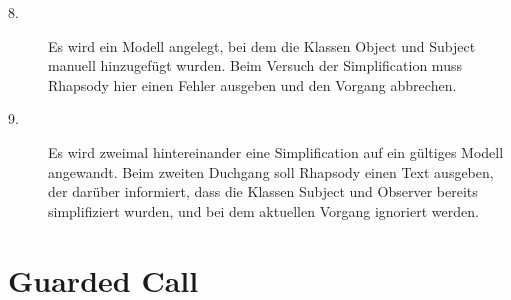 \begin{description}
	\item[8.]
	Es wird ein Modell angelegt, bei dem die Klassen Object und Subject manuell hinzugefügt wurden. Beim Versuch der Simplification muss Rhapsody hier einen Fehler ausgeben und den Vorgang abbrechen.
	
	\item[9.]
	Es wird zweimal hintereinander eine Simplification auf ein gültiges Modell angewandt. Beim zweiten Duchgang soll Rhapsody einen Text ausgeben, der darüber informiert, dass die Klassen Subject und Observer bereits simplifiziert wurden, und bei dem aktuellen Vorgang ignoriert werden.

\end{description}


\section{Guarded Call}

